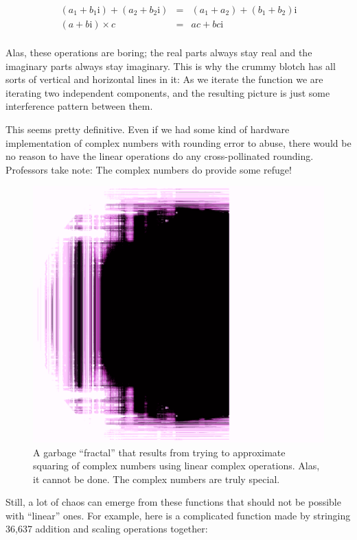\documentclass[twocolumn]{article}
\begin{document}
\[
\begin{array}{rcl}
  (a_1 + b_1\mathrm{i}) + (a_2 + b_2\mathrm{i}) & = & (a_1 + a_2) + (b_1 + b_2)\mathrm{i} \\[1em]
  (a + b\mathrm{i}) \times c & = & ac + bc\mathrm{i} \\
\end{array}
\]

Alas, these operations are boring; the real parts always stay real and
the imaginary parts always stay imaginary. This is why the crummy
blotch has all sorts of vertical and horizontal lines in it: As we
iterate the function we are iterating two independent components, and
the resulting picture is just some interference pattern between them.

This seems pretty definitive. Even if we had some kind of hardware
implementation of complex numbers with rounding error to abuse, there
would be no reason to have the linear operations do any
cross-pollinated rounding. Professors take note: The complex numbers
do provide some refuge!

\begin{figure}[htp]
  \includegraphics[width=0.95 \linewidth]{squarebrot}
  \caption{
    A garbage ``fractal'' that results from trying to approximate
    squaring of complex numbers using linear complex operations. Alas, it
    cannot be done. The complex numbers are truly special.
  } \label{fig:squarebrot}
\end{figure}

Still, a lot of chaos can emerge from these functions that should not
be possible with ``linear'' ones. For example, here is a complicated
function made by stringing 36,637 addition and scaling operations
together:
\end{document}
